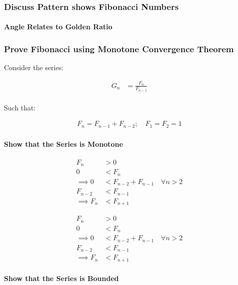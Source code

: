 \documentclass[11pt]{article}
\begin{document}
\subsubsection{Discuss Pattern shows Fibonacci Numbers}
\label{sec:org23d4a6c}
\paragraph{Angle Relates to Golden Ratio}
\label{sec:org5f3741a}
\subsubsection{Prove Fibonacci using Monotone Convergence Theorem}
\label{sec:orgf4ac00b}
Consider the series:

$$\begin{aligned}
G_n &= \frac{F_{n} }{F_{n - 1} } \\
\end{aligned}$$

Such that:

$$\begin{aligned}
F_n = F_{n- 1} +  F_{n- 2} ; \quad F_1 = F_2 = 1
\end{aligned}$$


\paragraph{Show that the Series is Monotone}
\label{sec:org40606b1}
$$\begin{aligned}
F_{n} &> 0 \\
0 &< F_{n} \\
 \implies   0 &< F_{n - 2} +  F_{n- 1} \quad \forall n > 2 \\
  F_{n- 2} &< F_{n- 1}  \\
   \implies  F_n & < F_{n+1}
\end{aligned}$$

$$\begin{aligned}
F_{n} &> 0 \\
0 &< F_{n} \\
 \implies   0 &< F_{n - 2} +  F_{n- 1} \quad \forall n > 2 \\
  F_{n- 2} &< F_{n- 1}  \\
   \implies  F_n & < F_{n+1}
\end{aligned}$$



\paragraph{Show that the Series is Bounded}
\label{sec:orge8f007c}
\end{document}
